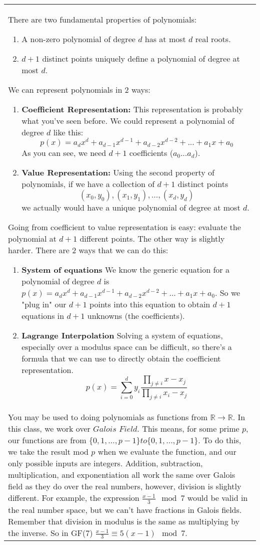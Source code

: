 {\tabulinesep=1mm
\begin{tabu}{|p{16cm} |}
\hline
There are two fundamental properties of polynomials:
\begin{enumerate}
    \item A non-zero polynomial of degree $d$ has at most $d$ real roots.
    \item $d + 1$ distinct points uniquely define a polynomial of degree at most $d$.
\end{enumerate}
We can represent polynomials in 2 ways:
\begin{enumerate}
    \item \textbf{Coefficient Representation:} This representation is probably what you've seen before. We could represent a polynomial of degree $d$ like this:
    \[p(x) = a_dx^d + a_{d-1}x^{d-1} + a_{d-2}x^{d-2} + ... +a_1x + a_0\]
    As you can see, we need $d+1$ coefficients ($a_0...a_d$).
    \item \textbf{Value Representation:} Using the second property of polynomials, if we have a collection of $d+1$ distinct points
    \[(x_0, y_0), (x_1, y_1), ... , (x_d, y_d)\]
    we actually would have a unique polynomial of degree at most $d$.
\end{enumerate}
Going from coefficient to value representation is easy: evaluate the polynomial at $d+1$ different points. The other way is slightly harder. There are 2 ways that we can do this:
\begin{enumerate}
    \item \textbf{System of equations} We know the generic equation for a polynomial of degree $d$ is $p(x) = a_dx^d + a_{d-1}x^{d-1} + a_{d-2}x^{d-2} + ... +a_1x + a_0$. So we "plug in" our $d+1$ points into this equation to obtain $d+1$ equations in $d+1$ unknowns (the coefficients). 
    \item \textbf{Lagrange Interpolation} Solving a system of equations, especially over a modulus space can be difficult, so there's a formula that we can use to directly obtain the coefficient representation. 
   \[p(x) = \sum_{i=0}^{d}y_i  \frac{\prod_{j\neq i}x-x_j}{\prod_{j\neq i}x_i -x_j}\] 
\end{enumerate} \\
You may be used to doing polynomials as functions from $\mathbb{R}\to\mathbb{R}$. In this class, we work over $\textit{Galois Field}$. This means, for some prime $p$, our functions are from $ \{0,1,...,p-1\} to \{0,1,...,p-1\}$. To do this, we take the result mod $p$ when we evaluate the function, and our only possible inputs are integers. Addition, subtraction, multiplication, and exponentiation all work the same over Galois field as they do over the real numbers, however, division is slightly different. For example, the expression $\frac{x-1}{3} \mod 7$ would be valid in the real number space, but we can't have fractions in Galois fields. Remember that division in modulus is the same as multiplying by the inverse. So in GF(7) $\frac{x-1}{3} \equiv 5(x-1) \mod 7$. 
\\
\hline
\end{tabu}
}
